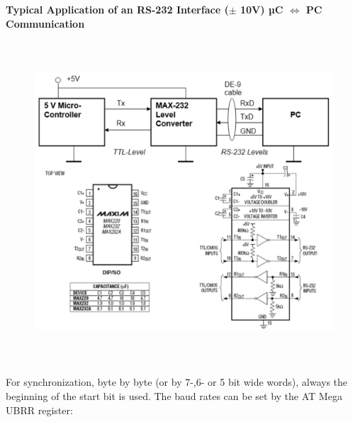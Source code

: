 \textbf{Typical Application of an RS-232 Interface ($\pm$ 10V) µC $\iff$ PC Communication}

    \begin{figure}[h]
    \centering
    \includegraphics[width=14cm, height=12cm]{Images/image46.png}
    \label{fig:Fig 143}
    \end{figure}

For synchronization, byte by byte (or by 7-,6- or 5 bit wide words), always the beginning of the start bit is used. The baud rates can be set by the AT Mega UBRR register:

